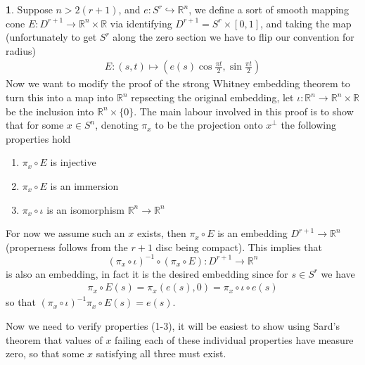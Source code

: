 \documentclass[10.5pt]{article}
\theoremstyle{definition}
\newtheorem{pb}{}
\newcommand{\set}[1]{\{#1\}}
\begin{document}
    \begin{pb}
        Suppose \(n > 2(r+1)\), and \(e: S^r \hookrightarrow \mathbb{R}^n\), we define a sort of smooth mapping cone \(E: D^{r+1} \to \mathbb{R}^n \times \mathbb{R}\) via identifying \(D^{r+1} = S^r \times [0,1]\), and taking the map (unfortunately to get \(S^r\) along the zero section we have to flip our convention for radius)
        \begin{align*}
            E:(s,t) \mapsto \left(e(s)\cos\frac{\pi t}{2},\sin\frac{\pi t}{2}\right)
        \end{align*}
        Now we want to modify the proof of the strong Whitney embedding theorem to turn this into a map into \(\mathbb{R}^n\) repsecting the original embedding, let \(\iota: \mathbb{R}^n \to \mathbb{R}^n\times \mathbb{R}\) be the inclusion into \(\mathbb{R}^n \times \set{0}\). The main labour involved in this proof is to show that for some \(x \in S^n\), denoting \(\pi_x\) to be the projection onto \(x^\perp\) the following properties hold
        \begin{enumerate}
            \item \(\pi_x \circ E\) is injective
            \item \(\pi_x \circ E\) is an immersion
            \item \(\pi_x \circ \iota\) is an isomorphism \(\mathbb{R}^n \to \mathbb{R}^n\)
        \end{enumerate}
        For now we assume such an \(x\) exists, then \(\pi_x \circ E\) is an embedding \(D^{r+1} \to \mathbb{R}^n\) (properness follows from the \(r+1\) disc being compact). This implies that \[(\pi_x \circ \iota)^{-1}\circ(\pi_x\circ E): D^{r+1} \to \mathbb{R}^n\] is also an embedding, in fact it is the desired embedding since for \(s \in S^r\) we have
        \begin{align*}
            \pi_x\circ E(s) = \pi_x(e(s),0) = \pi_x\circ\iota\circ e(s)
        \end{align*}
        so that \((\pi_x\circ \iota)^{-1}\pi_x\circ E(s) = e(s)\).

        Now we need to verify properties (1-3), it will be easiest to show using Sard's theorem that values of \(x\) failing each of these individual properties have measure zero, so that some \(x\) satisfying all three must exist.
    \end{pb}
\end{document}
